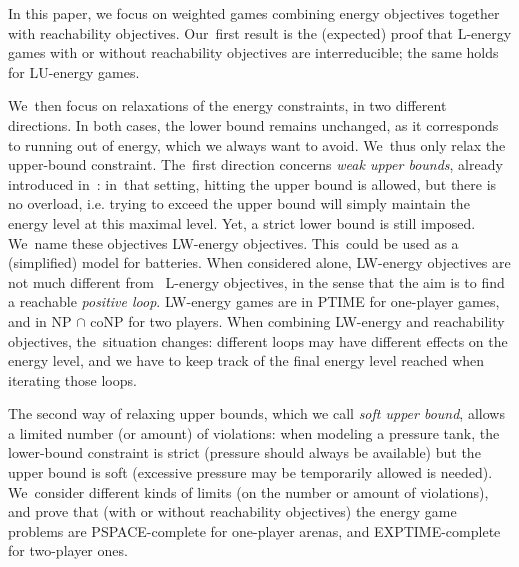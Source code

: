 In this paper, we focus on weighted games combining energy objectives
together with reachability objectives. Our~first result is the
(expected) proof that L-energy games with or without reachability
objectives are interreducible; the same holds for LU-energy games.

%
We~then focus on relaxations of the energy constraints, in two
different directions. In both cases, the lower bound remains
unchanged, as it corresponds to running out of energy, which we always
want to avoid. We~thus only relax the upper-bound constraint.
The~first direction concerns \emph{weak upper bounds}, already
introduced in~\cite{BouyerFLMS08}: in~that setting, hitting the upper bound
is allowed, but there is no overload, i.e. trying to exceed the upper bound will simply maintain the energy level at this maximal level. Yet, a strict lower bound is
still imposed. We~name these objectives LW-energy
objectives. This~could be used as a (simplified) model for batteries.
When considered alone, LW-energy objectives are not much different
from~ L-energy objectives, in the sense that the aim is to find a
reachable \emph{positive loop}. LW-energy games are in PTIME for
one-player games, and in NP $\cap$ coNP for two players. When
combining LW-energy and reachability objectives, the~situation
changes: different loops may have different effects on the energy
level, and we have to keep track of the final energy level reached
when iterating those loops.

The second way of relaxing upper bounds, which we call \emph{soft
upper bound}, allows a limited number (or amount) of
violations: when modeling a pressure tank, the lower-bound constraint
is strict (pressure should always be available) but the upper bound is
soft (excessive pressure may be temporarily allowed is
needed). We~consider different kinds of limits (on the number or
amount of violations), and prove that (with or without reachability
objectives) the energy game problems are PSPACE-complete for one-player arenas,
and EXPTIME-complete for two-player ones.



